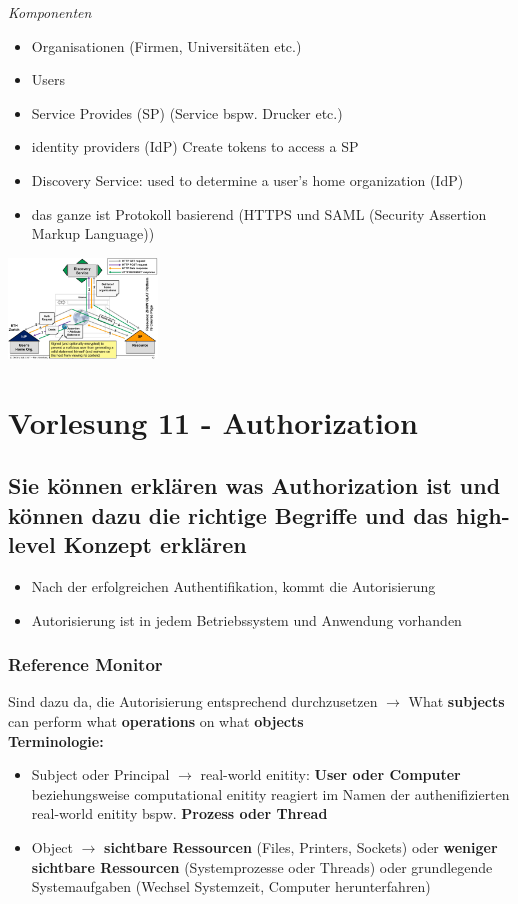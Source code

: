 \documentclass{report}
\newenvironment{Figure}
	{\par\medskip\noindent\minipage{\linewidth}}
	{\endminipage\par\medskip}
\theoremstyle{definition}
\theoremstyle{example}
\begin{document}
\textit{Komponenten}
\begin{itemize}
	\item Organisationen (Firmen, Universitäten etc.)
	\item Users
	\item Service Provides (SP) (Service bspw. Drucker etc.)
	\item identity providers (IdP) Create tokens to access a SP
	\item Discovery Service: used to determine a user's home organization (IdP)
	\item das ganze ist Protokoll basierend (HTTPS und SAML (Security Assertion Markup Language))
\end{itemize}
\begin{Figure}
\centering
\includegraphics[width=150px]{img/Shibboleth.png}
	\label{fig:Abbildung des Schemas für Shibboleth}
\end{Figure}


\chapter{Vorlesung 11 - Authorization}

\section{Sie können erklären was Authorization ist und können dazu die richtige Begriffe und das high-level Konzept erklären}
	\begin{itemize}
		\item Nach der erfolgreichen Authentifikation, kommt die Autorisierung
		\item Autorisierung ist in jedem Betriebssystem und Anwendung vorhanden
	\end{itemize}

	\subsection{Reference Monitor}
Sind dazu da, die Autorisierung entsprechend durchzusetzen $\rightarrow$ What \textbf{subjects} can perform what \textbf{operations} on what \textbf{objects}\\
\textbf{Terminologie:}
\begin{itemize}
	\item Subject oder Principal $\rightarrow$ real-world enitity: \textbf{User oder Computer} beziehungsweise computational enitity reagiert im Namen der authenifizierten real-world enitity bspw. \textbf{Prozess oder Thread}
	\item Object $\rightarrow$ \textbf{sichtbare Ressourcen} (Files, Printers, Sockets) oder \textbf{weniger sichtbare Ressourcen} (Systemprozesse oder Threads) oder grundlegende Systemaufgaben (Wechsel Systemzeit, Computer herunterfahren)
\end{itemize}
\end{document}

